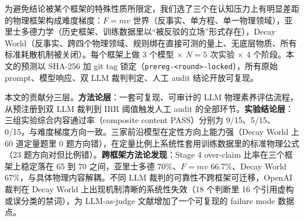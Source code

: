 \documentclass[11pt]{article}
\begin{document}
为避免结论被某个框架的特殊性质所限定，我们选了三个在认知压力上有明显差距的物理框架构成难度梯度：$F=mv$ 世界（反事实、单方程、单一物理领域），亚里士多德力学（历史框架、训练数据里以“被反驳的立场”形式存在），Decay World（反事实、跨四个物理领域、规则绑在直接可测的量上、无底层物质、所有标准耗散机制被关闭）。每个框架上做 3 个模型 $\times$ $N=5$ 次实验 $\times$ 4 个阶段。本文的预测以 SHA-256 加 git tag 锁定（\texttt{prereg-<round>-locked}），所有原始 prompt、模型响应、双 LLM 裁判判定、人工 audit 结论开放可复现。

本文的贡献分三层。\textbf{方法论层}：一套可复现、可审计的 LLM 物理素养评估流程，从预注册到双 LLM 裁判到 IRR 阈值触发人工 audit 的全部环节。\textbf{实验结论层}：三组实验综合内容通过率（composite content PASS）分别为 9/15、5/15、0/15，与难度梯度方向一致。三家前沿模型在定性方向上能力强（Decay World 上 60 道定量题里 0 题方向错），在定量比例上系统性套用训练数据里的标准物理公式（23 题方向对但比例错）。\textbf{跨框架方法论发现}：Stage 4 over-claim 比率在三个框架上稳定落在 65 到 70 之间，亚里士多德 70\%、$F=mv$ 66.7\%、Decay World 67\%，与具体物理内容解耦。不同 LLM 裁判的可靠性不跨框架可迁移，OpenAI 裁判在 Decay World 上出现机制清晰的系统性失效（18 个判断里 16 个引用虚构或误分类的禁词），为 LLM-as-judge 文献增加了一个可复现的 failure mode 数据点。



\end{document}
